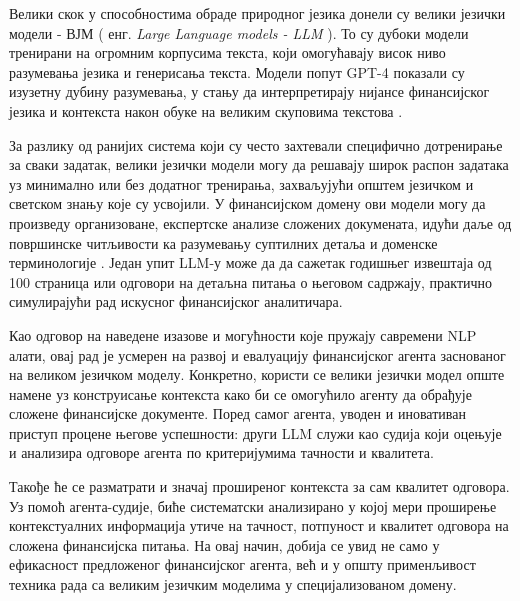 Велики скок у способностима обраде природног језика донели су велики језички модели - ВЈМ ( енг. \textit{Large Language models - LLM} ). То су дубоки модели тренирани на огромним корпусима текста, који омогућавају висок ниво разумевања језика и генерисања текста. Модели попут GPT-4 показали су изузетну дубину разумевања, у стању да интерпретирају нијансе финансијског језика и контекста након обуке на великим скуповима текстова \cite{paro_ai_strategic_2023}. 
\newline

За разлику од ранијих система који су често захтевали специфично дотренирање за сваки задатак, велики језички модели могу да решавају широк распон задатака уз минимално или без додатног тренирања, захваљујући општем језичком и светском знању које су усвојили. У финансијском домену ови модели могу да произведу организоване, експертске анализе сложених докумената, идући даље од површинске читљивости ка разумевању суптилних детаља и доменске терминологије \cite{yang_evaluating_2025}. Један упит LLM-у може да да сажетак годишњег извештаја од 100 страница или одговори на детаљна питања о његовом садржају, практично симулирајући рад искусног финансијског аналитичара.

Као одговор на наведене изазове и могућности које пружају савремени NLP алати, овај рад је усмерен на развој и евалуацију финансијског агента заснованог на великом језичком моделу. Конкретно, користи се велики језички модел опште намене уз конструисање контекста како би се омогућило агенту да обрађује сложене финансијске документе. Поред самог агента, уводен и иновативан приступ процене његове успешности: други LLM служи као судија који оцењује и анализира одговоре агента по критеријумима тачности и квалитета. 
\newline

Такође ће се разматрати и значај проширеног контекста за сам квалитет одговора. Уз помоћ агента-судије, биће систематски анализирано у којој мери проширење контекстуалних информација утиче на тачност, потпуност и квалитет одговора на сложена финансијска питања. На овај начин, добија се увид не само у ефикасност предложеног финансијског агента, већ и у општу применљивост техника рада са великим језичким моделима у специјализованом домену.